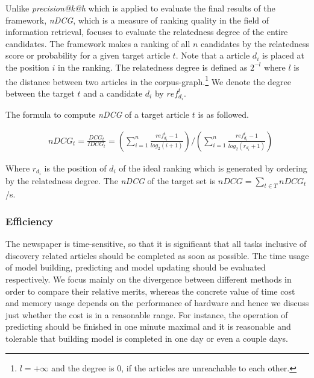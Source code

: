 Unlike \textit{precision@k@h} which is applied to evaluate the final results of the framework, \textit{nDCG}, which is a measure of ranking quality in the field of information retrieval, focuses to evaluate the relatedness degree of the entire candidates. The framework makes a ranking of all $n$ candidates by the relatedness score or probability for a given target article $t$. Note that a article $d_i$ is placed at the position $i$ in the ranking. The relatedness degree is defined as $2^{-l}$ where $l$ is the distance between two articles in the corpus-graph.\footnote{$l=+\infty$ and the degree is $0$, if the articles are unreachable to each other.} We denote the degree between the target $t$ and a candidate $d_i$ by $ref_{d_i}^t$.

The formula to compute \textit{nDCG} of a target article $t$ is as followed. 

\begin{align}
   & nDCG_t = \frac{DCG_t}{IDCG_t} = (\sum_{i=1}^n\frac{ref_{d_i}^t-1}{log_2(i+1)})/(\sum_{i=1}^n\frac{ref_{d_i}^t-1}{log_2(r_{d_i}+1)})
\end{align}

Where $r_{d_i}$ is the position of $d_i$ of the ideal ranking which is generated by ordering by the relatedness degree. The \textit{nDCG} of the target set is $nDCG = \sum_{t \in T}nDCG_t$/s.

\subsubsection{Efficiency}

The newspaper is time-sensitive, so that it is significant that all tasks inclusive of discovery related articles should be completed as soon as possible. The time usage of model building, predicting and model updating should be evaluated respectively. We focus mainly on the divergence between different methods in order to compare their relative merits, whereas the concrete value of time cost and memory usage depends on the performance of hardware and hence we discuss just whether the cost is in a reasonable range. For instance, the operation of predicting should be finished in one minute maximal and it is reasonable and tolerable that building model is completed in one day or even a couple days. 